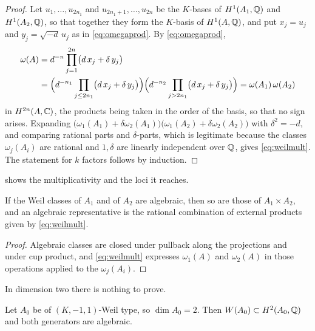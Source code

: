 \begin{proof}
Let $u_{1},\dots,u_{2n_{1}}$ and $u_{2n_{1}+1},\dots,u_{2n}$ be the
$K$-bases of $H^{1}(A_{1},\mathbb{Q})$ and $H^{1}(A_{2},\mathbb{Q})$, so that together they
form the $K$-basis of $H^{1}(A,\mathbb{Q})$, and put $x_{j}=u_{j}$ and
$y_{j}=\sqrt{-d}\,u_{j}$ as in \eqref{eq:omegaprod}. By \eqref{eq:omegaprod},
\[
\begin{aligned}
  \omega(A)
  &=d^{-n}\prod_{j=1}^{2n}\bigl(d\,x_{j}+\delta\,y_{j}\bigr)\\
  &=\Bigl(d^{-n_{1}}\prod_{j\le2n_{1}}\bigl(d\,x_{j}+\delta\,y_{j}\bigr)\Bigr)
   \Bigl(d^{-n_{2}}\prod_{j>2n_{1}}\bigl(d\,x_{j}+\delta\,y_{j}\bigr)\Bigr)
  =\omega(A_{1})\,\omega(A_{2})
\end{aligned}
\]
in $H^{2n}(A,\mathbb{C})$, the products being taken in the order of the basis, so
that no sign arises. Expanding
$\bigl(\omega_{1}(A_{1})+\delta\omega_{2}(A_{1})\bigr)
\bigl(\omega_{1}(A_{2})+\delta\omega_{2}(A_{2})\bigr)$ with $\delta^{2}=-d$,
and comparing rational parts and $\delta$-parts, which is legitimate because
the classes $\omega_{j}(A_{i})$ are rational and $1,\delta$ are linearly
independent over $\mathbb{Q}$, gives \eqref{eq:weilmult}. The statement for $k$
factors follows by induction.
\end{proof}

 shows the multiplicativity and the loci it reaches.

\begin{corollary}\label{cor:prodalg}
If the Weil classes of $A_{1}$ and of $A_{2}$ are algebraic, then so are those
of $A_{1}\times A_{2}$, and an algebraic representative is the rational
combination of external products given by \eqref{eq:weilmult}.
\end{corollary}

\begin{proof}
Algebraic classes are closed under pullback along the projections and under
cup product, and \eqref{eq:weilmult} expresses $\omega_{1}(A)$ and
$\omega_{2}(A)$ in those operations applied to the $\omega_{j}(A_{i})$.
\end{proof}

In dimension two there is nothing to prove.

\begin{lemma}\label{lem:basecase}
Let $A_{0}$ be of $(K,-1,1)$-Weil type, so $\dim A_{0}=2$. Then
$W(A_{0})\subset H^{2}(A_{0},\mathbb{Q})$ and both generators are algebraic.
\end{lemma}

